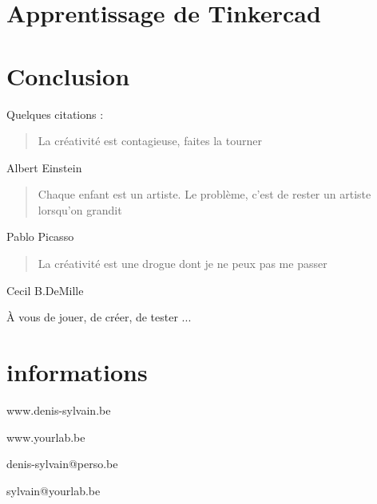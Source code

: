 \documentclass{article}
\begin{document}
\section{Apprentissage de Tinkercad}



\section{Conclusion}
Quelques citations :

\begin{quotation}
La créativité est contagieuse, faites la tourner
\end{quotation}
\begin{flushright}
Albert Einstein
\end{flushright} 

\begin{quotation}
Chaque enfant est un artiste. Le problème, c'est de rester un artiste lorsqu'on grandit
\end{quotation}
\begin{flushright}
Pablo Picasso
\end{flushright} 

\begin{quotation}
La créativité est une drogue dont je ne peux pas me passer
\end{quotation}
\begin{flushright}
Cecil B.DeMille
\end{flushright} 

\begin{center}
{\LARGE À vous de jouer, de créer, de tester ...} 
\end{center}

\section{informations}
\begin{center}
www.denis-sylvain.be

www.yourlab.be

denis-sylvain@perso.be

sylvain@yourlab.be
\end{center}
\end{document}

